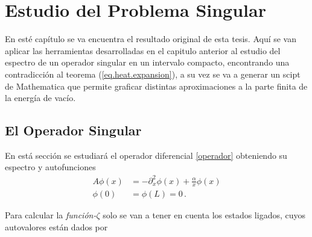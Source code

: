 \chapter{Estudio del Problema Singular}


En esté capítulo se va encuentra el resultado original de esta tesis. Aquí se van aplicar las herramientas desarrolladas en el capitulo anterior al estudio del espectro de un operador singular en un intervalo compacto, encontrando una contradicción al teorema (\ref{eq.heat.expansion}), a su vez se va a generar un scipt de Mathematica que permite graficar distintas aproximaciones a la parte finita de la energía de vacío.

\section{El Operador Singular}


En está sección se estudiará el operador diferencial \ref{operador} obteniendo su espectro y autofunciones
\begin{equation}
\begin{aligned}
    A \phi (x) &= - \partial ^2 _x  \phi(x) + \frac{\alpha}{x} \phi(x) \\[5pt]
    \phi(0) &= \phi(L) = 0 \, .
\end{aligned}
\label{operador}
\end{equation}

Para calcular la {\it función-$\zeta$} solo se van a tener en cuenta los estados ligados, cuyos autovalores están dados por 

